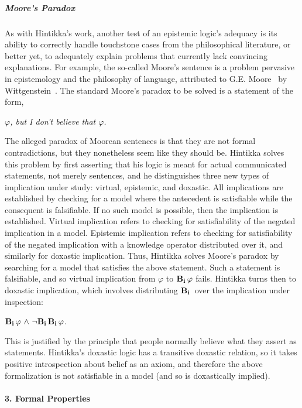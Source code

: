 \subparagraph{Moore's Paradox}

As with Hintikka's work, another test of an epistemic logic's adequacy is its ability to correctly handle touchstone cases from the philosophical literature, or better yet, to adequately explain problems that currently lack convincing explanations. For example, the so-called Moore's sentence is a problem pervasive in epistemology and the philosophy of language, attributed to G.E. Moore~\cite{Moore} by Wittgenstein~\cite{Wittgenstein}. The standard Moore's paradox to be solved is a statement of the form,
\begin{center}
	\emph{$\varphi$, but I don't believe that $\varphi$.}
\end{center}

The alleged paradox of Moorean sentences is that they are not formal contradictions, but they nonetheless seem like they should be. Hintikka solves this problem by first asserting that his logic is meant for actual communicated statements, not merely sentences, and he distinguishes three new types of implication under study: virtual, epistemic, and doxastic. All implications are established by checking for a model where the antecedent is satisfiable while the consequent is falsifiable. If no such model is possible, then the implication is established. Virtual implication refers to checking for satisfiability of the negated implication in a model. Epistemic implication refers to checking for satisfiability of the negated implication with a knowledge operator distributed over it, and similarly for doxastic implication. Thus, Hintikka solves Moore's paradox by searching for a model that satisfies the above statement. Such a statement is falsifiable, and so virtual implication from $\varphi$ to $\mathbf{B}_{\mathbf{i}}\,\varphi$ fails. Hintikka turns then to doxastic implication, which involves distributing $\mathbf{B}_{\mathbf{i}}\,$ over the implication under inspection:
\begin{center}
	$\mathbf{B}_{\mathbf{i}}\,\varphi {\ \wedge \ } {\neg} \mathbf{B}_{\mathbf{i}}\,\mathbf{B}_{\mathbf{i}}\,\varphi$.
\end{center}

This is justified by the principle that people normally believe what they assert as statements. Hintikka's doxastic logic has a transitive doxastic relation, so it takes positive introspection about belief as an axiom, and therefore the above formalization is not satisfiable in a model (and so is doxastically implied). 

\paragraph{3. Formal Properties}

